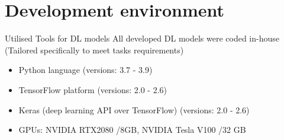\documentclass[10pt,aspectratio=169,dvipsnames]{beamer} %
\begin{document}
	
	\section{Development environment}
	\setcounter{subfigure}{0}
	
	\begin{frame}{Utilised Tools for DL models}
		All developed DL models were \alert{coded in-house} \\
		\alert{(Tailored specifically to meet tasks requirements)} 
		\begin{itemize}			
			\item \alert{Python} language (versions: 3.7 - 3.9)			
			\item \alert{TensorFlow} platform (versions: 2.0 - 2.6)
			\item \alert{Keras} (deep learning API over TensorFlow) (versions: 2.0 - 2.6)
			\item \alert{GPUs}: NVIDIA RTX2080 /8GB, NVIDIA Tesla V100 /32 GB
		\end{itemize}
	\end{frame}
\end{document}
